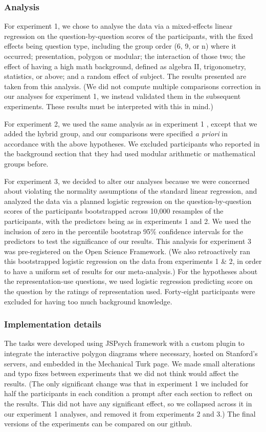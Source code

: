 \documentclass[man,mask,10pt]{apa6}
\begin{document}
\subsubsection{Analysis}
For experiment 1, we chose to analyse the data via a mixed-effects linear regression on the question-by-question scores of the participants, with the fixed effects being question type, including the group order (6, 9, or n) where it occurred; presentation, polygon or modular; the interaction of those two; the effect of having a high math background, defined as algebra II, trigonometry, statistics, or above; and a random effect of subject. The results presented are taken from this analysis. (We did not compute multiple comparisons correction in our analyses for experiment 1, we instead validated them in the subsequent experiments. These results must be interpreted with this in mind.) \par 
For experiment 2, we used the same analysis as in experiment 1 , except that we added the hybrid group, and our comparisons were specified \textit{a priori} in accordance with the above hypotheses. We excluded  participants who reported in the background section that they had used modular arithmetic or mathematical groups before. \par
For experiment 3, we decided to alter our analyses because we were concerned about violating the normality assumptions of the standard linear regression, and analyzed the data via a planned logistic regression on the question-by-question scores of the participants bootstrapped across 10,000 resamples of the participants, with the predictors being as in experiments 1 and 2. We used the inclusion of zero in the percentile bootstrap 95\% confidence intervals for the predictors to test the significance of our results. This analysis for experiment 3 was pre-registered on the Open Science Framework.
(We also retroactively ran this bootstrapped logistic regression on the data from experiments 1 \& 2, in order to have a uniform set of results for our meta-analysis.) For the hypotheses about the representation-use questions, we used logistic regression predicting score on the question by the ratings of representation used. Forty-eight participants were excluded for having too much background knowledge.
\subsubsection{Implementation details}
The tasks were developed using JSPsych framework with a custom plugin to integrate the interactive polygon diagrams where necessary, hosted on Stanford's servers, and embedded in the Mechanical Turk page. We made small alterations and typo fixes between experiments that we did not think would affect the results. (The only significant change was that in experiment 1 we included for half the participants in each condition a prompt after each section to reflect on the results. This did not have any significant effect, so we collapsed across it in our experiment 1 analyses, and removed it from experiments 2 and 3.) The final versions of the experiments can be compared on our github.%
\end{document}
